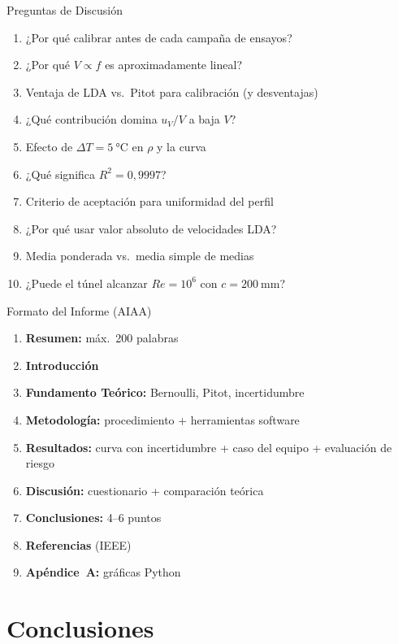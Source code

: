\documentclass[aspectratio=169,12pt]{beamer}
\begin{document}
\begin{frame}{Preguntas de Discusión}
	\begin{enumerate}\small
		\item ¿Por qué calibrar antes de cada campaña de ensayos?
		\item ¿Por qué $V \propto f$ es aproximadamente lineal?
		\item Ventaja de LDA vs.\ Pitot para calibración (y desventajas)
		\item ¿Qué contribución domina $u_V/V$ a baja $V$?
		\item Efecto de $\Delta T = \SI{5}{\degreeCelsius}$ en $\rho$ y la curva
		\item ¿Qué significa $R^2 = 0{,}9997$?
		\item Criterio de aceptación para uniformidad del perfil
		\item ¿Por qué usar valor absoluto de velocidades LDA?
		\item Media ponderada vs.\ media simple de medias
		\item ¿Puede el túnel alcanzar $Re = 10^6$ con $c = \SI{200}{\mm}$?
	\end{enumerate}
\end{frame}

\begin{frame}{Formato del Informe (AIAA)}
	\begin{enumerate}
		\item \textbf{Resumen:} máx.\ 200 palabras
		\item \textbf{Introducción}
		\item \textbf{Fundamento Teórico:} Bernoulli, Pitot, incertidumbre
		\item \textbf{Metodología:} procedimiento + herramientas software
		\item \textbf{Resultados:} curva con incertidumbre + caso del equipo
		      + evaluación de riesgo
		\item \textbf{Discusión:} cuestionario + comparación teórica
		\item \textbf{Conclusiones:} 4--6 puntos
		\item \textbf{Referencias} (IEEE)
		\item \textbf{Apéndice~A:} gráficas Python
	\end{enumerate}
\end{frame}

\section{Conclusiones}
\end{document}
